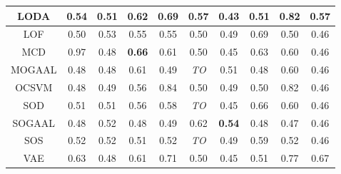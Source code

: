 \begin{table*}[!b]
\begin{tabular}{|c|c|c|c|c|c|c|c|c|c|}
\hline
            LODA &          0.54 &               0.51 &          0.62 &                0.69 &          0.57 &               0.43 &            0.51 &          0.82 &          0.57 \\
\hline
            LOF &          0.50 &               0.53 &          0.55 &                0.55 &          0.50 &               0.49 &            0.69 &          0.50 &          0.46 \\
\hline
            MCD &          0.97 &               0.48 & \textbf{0.66} &                0.61 &          0.50 &               0.45 &            0.63 &          0.60 &          0.46 \\
\hline
        MOGAAL &          0.48 &               0.48 &          0.61 &                0.49 &   \textit{TO} &               0.51 &            0.48 &          0.60 &          0.46 \\
\hline
            OCSVM &          0.48 &               0.49 &          0.56 &                0.84 &          0.50 &               0.49 &            0.50 &          0.82 &          0.46 \\
\hline
            SOD &          0.51 &               0.51 &          0.56 &                0.58 &   \textit{TO} &               0.45 &            0.66 &          0.60 &          0.46 \\
\hline
        SOGAAL &          0.48 &               0.52 &          0.48 &                0.49 &          0.62 &      \textbf{0.54} &            0.48 &          0.47 &          0.46 \\
\hline
            SOS &          0.52 &               0.52 &          0.51 &                0.52 &   \textit{TO} &               0.49 &            0.59 &          0.52 &          0.46 \\
\hline
            VAE &          0.63 &               0.48 &          0.61 &                0.71 &          0.50 &               0.45 &            0.51 &          0.77 &          0.67 \\
\hline
\end{tabular}
\end{table*}


